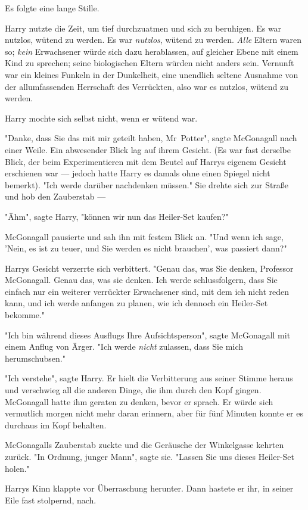 {Es folgte eine lange Stille.

Harry nutzte die Zeit, um tief durchzuatmen und sich zu beruhigen. Es war nutzlos, wütend zu werden. Es war \emph{nutzlos}, wütend zu werden. \emph{Alle} Eltern waren so; \emph{kein} Erwachsener würde sich dazu herablassen, auf gleicher Ebene mit einem Kind zu sprechen; seine biologischen Eltern würden nicht anders sein. Vernunft war ein kleines Funkeln in der Dunkelheit, eine unendlich seltene Ausnahme von der allumfassenden Herrschaft des Verrückten, also war es nutzlos, wütend zu werden.

Harry mochte sich selbst nicht, wenn er wütend war.

"Danke, dass Sie das mit mir geteilt haben, Mr~Potter", sagte McGonagall nach einer Weile. Ein abwesender Blick lag auf ihrem Gesicht. (Es war fast derselbe Blick, der beim Experimentieren mit dem Beutel auf Harrys eigenem Gesicht erschienen war --- jedoch hatte Harry es damals ohne einen Spiegel nicht bemerkt). "Ich werde darüber nachdenken müssen." Sie drehte sich zur Straße und hob den Zauberstab ---

"Ähm", sagte Harry, "können wir nun das Heiler-Set kaufen?"

McGonagall pausierte und sah ihn mit festem Blick an. "Und wenn ich sage, 'Nein, es ist zu teuer, und Sie werden es nicht brauchen', was passiert dann?"

Harrys Gesicht verzerrte sich verbittert. "Genau das, was Sie denken, Professor McGonagall. Genau das, was sie denken. Ich werde schlussfolgern, dass Sie einfach nur ein weiterer verrückter Erwachsener sind, mit dem ich nicht reden kann, und ich werde anfangen zu planen, wie ich dennoch ein Heiler-Set bekomme."

"Ich bin während dieses Ausflugs Ihre Aufsichtsperson", sagte McGonagall mit einem Anflug von Ärger. "Ich werde \emph{nicht} zulassen, dass Sie mich herumschubsen."

"Ich verstehe", sagte Harry. Er hielt die Verbitterung aus seiner Stimme heraus und verschwieg all die anderen Dinge, die ihm durch den Kopf gingen. McGonagall hatte ihm geraten zu denken, bevor er sprach. Er würde sich vermutlich morgen nicht mehr daran erinnern, aber für fünf Minuten konnte er es durchaus im Kopf behalten.

McGonagalls Zauberstab zuckte und die Geräusche der Winkelgasse kehrten zurück. "In Ordnung, junger Mann", sagte sie. "Lassen Sie uns dieses Heiler-Set holen."

Harrys Kinn klappte vor Überraschung herunter. Dann hastete er ihr, in seiner Eile fast stolpernd, nach.

}
